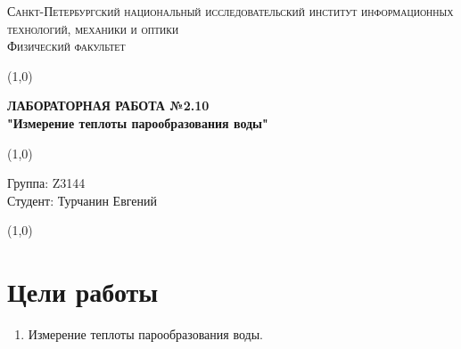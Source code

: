 \documentclass[a4paper]{article}
\begin{document}
\begin{center}
\textsc{Санкт-Петербургский национальный исследовательский институт информационных технологий, механики и оптики\\[3mm]
Физический факультет} \\[3mm]

\end{center}
\vspace{5mm}
\line(1,0){\textwidth}
\begin{center}
\textbf{ЛАБОРАТОРНАЯ РАБОТА №2.10\\}
\textbf{"Измерение теплоты парообразования воды"}
\end{center}
\vspace{2mm}
\line(1,0){\textwidth}
\vspace{5mm}
\begin{minipage}{0.4\textwidth}
    Группа: Z3144 \\
    Студент: Турчанин Евгений\\
    \vspace{1mm}
\end{minipage}
\hfill
\vspace{1mm}
\line(1,0){\textwidth}


\section{Цели работы}
\begin{enumerate}
    \item Измерение теплоты парообразования воды.
\end{enumerate}
\end{document}
